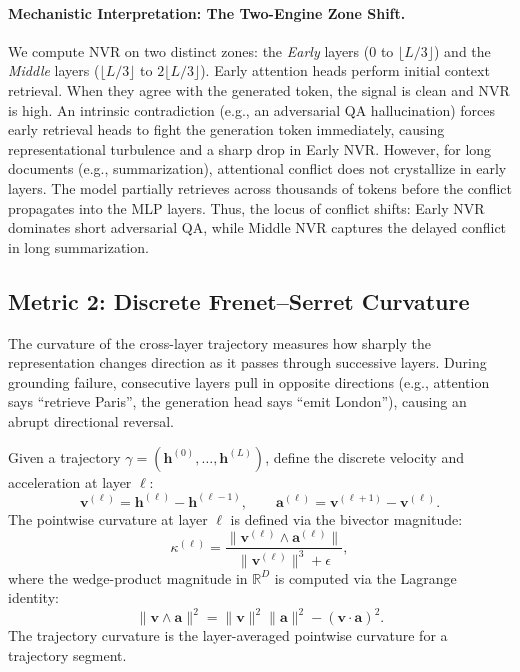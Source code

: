 \documentclass[10pt]{article}
\newcommand{\R}{\mathbb{R}}
\begin{document}
\paragraph{Mechanistic Interpretation: The Two-Engine Zone Shift.}
We compute NVR on two distinct zones: the \emph{Early} layers ($0$ to $\lfloor L/3 \rfloor$) and the \emph{Middle} layers ($\lfloor L/3 \rfloor$ to $2\lfloor L/3 \rfloor$).
Early attention heads perform initial context retrieval. When they agree with the generated token, the signal is clean and NVR is high. An intrinsic contradiction (e.g., an adversarial QA hallucination) forces early retrieval heads to fight the generation token immediately, causing representational turbulence and a sharp drop in Early NVR.
However, for long documents (e.g., summarization), attentional conflict does not crystallize in early layers. The model partially retrieves across thousands of tokens before the conflict propagates into the MLP layers. Thus, the locus of conflict shifts: Early NVR dominates short adversarial QA, while Middle NVR captures the delayed conflict in long summarization.

\subsection{Metric 2: Discrete Frenet--Serret Curvature}
\label{sec:curvature}

The curvature of the cross-layer trajectory measures how sharply the representation changes direction as it passes through successive layers.
During grounding failure, consecutive layers pull in opposite directions (e.g., attention says ``retrieve Paris'', the generation head says ``emit London''), causing an abrupt directional reversal.

\begin{definition}
Given a trajectory $\gamma = (\mathbf{h}^{(0)}, \ldots, \mathbf{h}^{(L)})$, define the discrete velocity and acceleration at layer $\ell$:
\begin{equation}
    \mathbf{v}^{(\ell)} = \mathbf{h}^{(\ell)} - \mathbf{h}^{(\ell-1)}, \qquad
    \mathbf{a}^{(\ell)} = \mathbf{v}^{(\ell+1)} - \mathbf{v}^{(\ell)}.
\end{equation}
The pointwise curvature at layer $\ell$ is defined via the bivector magnitude:
\begin{equation}
    \kappa^{(\ell)} = \frac{\|\mathbf{v}^{(\ell)} \wedge \mathbf{a}^{(\ell)}\|}{\|\mathbf{v}^{(\ell)}\|^3 + \epsilon},
    \label{eq:curvature}
\end{equation}
where the wedge-product magnitude in $\R^D$ is computed via the Lagrange identity:
\begin{equation}
    \|\mathbf{v} \wedge \mathbf{a}\|^2 = \|\mathbf{v}\|^2 \|\mathbf{a}\|^2 - (\mathbf{v} \cdot \mathbf{a})^2.
    \label{eq:lagrange}
\end{equation}
The trajectory curvature is the layer-averaged pointwise curvature for a trajectory segment.
\end{definition}
\end{document}
